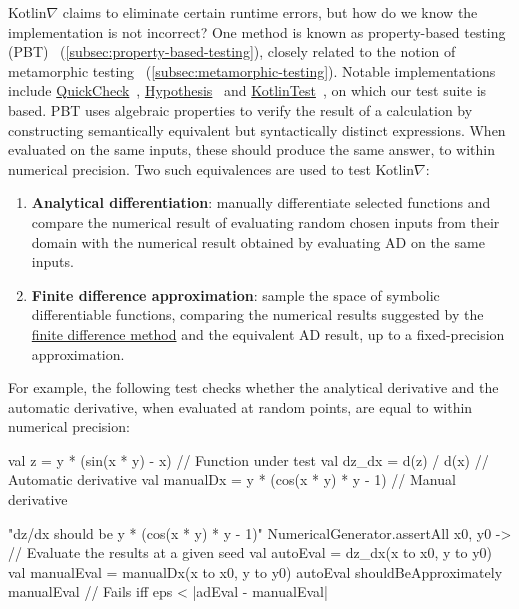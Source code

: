 Kotlin$\nabla$ claims to eliminate certain runtime errors, but how do we know the implementation is not incorrect? One method is known as property-based testing (PBT)~\citep{fink1997property} (\autoref{subsec:property-based-testing}), closely related to the notion of metamorphic testing~\citep{chen1998metamorphic} (\autoref{subsec:metamorphic-testing}). Notable implementations include \href{http://www.cse.chalmers.se/~rjmh/QuickCheck/manual.html}{QuickCheck}~\citep{claessen2011quickcheck}, \href{https://hypothesis.readthedocs.io/en/latest/}{Hypothesis}~\citep{Hypothesis} and \href{https://github.com/kotlintest/kotlintest}{KotlinTest}~\citep{kotlintest}, on which our test suite is based. PBT uses algebraic properties to verify the result of a calculation by constructing semantically equivalent but syntactically distinct expressions. When evaluated on the same inputs, these should produce the same answer, to within numerical precision. Two such equivalences are used to test Kotlin$\nabla$: \\
%
\begin{enumerate}
    \item \textbf{Analytical differentiation}: manually differentiate selected functions and compare the numerical result of evaluating random chosen inputs from their domain with the numerical result obtained by evaluating AD on the same inputs.
    \item \textbf{Finite difference approximation}: sample the space of symbolic differentiable functions, comparing the numerical results suggested by the \hyperref[sec:fdm]{finite difference method} and the equivalent AD result, up to a fixed-precision approximation. \\
\end{enumerate}
%
For example, the following test checks whether the analytical derivative and the automatic derivative, when evaluated at random points, are equal to within numerical precision:
%
\begin{kotlinlisting}
val z = y * (sin(x * y) - x)            // Function under test
val dz_dx = d(z) / d(x)                 // Automatic derivative
val manualDx = y * (cos(x * y) * y - 1) // Manual derivative

"dz/dx should be y * (cos(x * y) * y - 1)" {
    NumericalGenerator.assertAll { x0, y0 ->
        // Evaluate the results at a given seed
        val autoEval = dz_dx(x to x0, y to y0)
        val manualEval = manualDx(x to x0, y to y0)
        autoEval shouldBeApproximately manualEval // Fails iff eps < |adEval - manualEval|
    }
}
\end{kotlinlisting}
